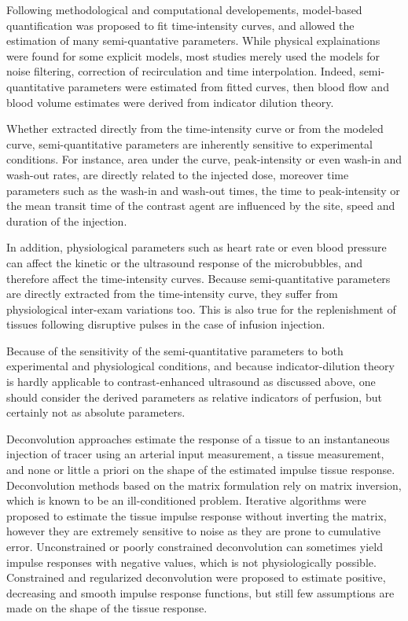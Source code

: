 Following methodological and computational developements, model-based quantification was proposed to fit time-intensity curves, and allowed the estimation of many semi-quantative parameters. 
While physical explainations were found for some explicit models, most studies merely used the models for noise filtering, correction of recirculation and time interpolation.
Indeed, semi-quantitative parameters were estimated from fitted curves, then blood flow and blood volume estimates were derived from indicator dilution theory.

Whether extracted directly from the time-intensity curve or from the modeled curve, semi-quantitative parameters are inherently sensitive to experimental conditions.
For instance, area under the curve, peak-intensity or even wash-in and wash-out rates, are directly related to the injected dose, moreover time parameters such as the wash-in and wash-out times, the time to peak-intensity or the mean transit time of the contrast agent are influenced by the site, speed and duration of the injection.

In addition, physiological parameters such as heart rate or even blood pressure can affect the kinetic or the ultrasound response of the microbubbles, and therefore affect the time-intensity curves. 
Because semi-quantitative parameters are directly extracted from the time-intensity curve, they suffer from physiological inter-exam variations too. 
This is also true for the replenishment of tissues following disruptive pulses in the case of infusion injection.

Because of the sensitivity of the semi-quantitative parameters to both experimental and physiological conditions, and because indicator-dilution theory is hardly applicable to contrast-enhanced ultrasound as discussed above, one should consider the derived parameters as relative indicators of perfusion, but certainly not as absolute parameters.

Deconvolution approaches estimate the response of a tissue to an instantaneous injection of tracer using an arterial input measurement, a tissue measurement, and none or little a priori on the shape of the estimated impulse tissue response.
Deconvolution methods based on the matrix formulation rely on matrix inversion, which is known to be an ill-conditioned problem.
Iterative algorithms were proposed to estimate the tissue impulse response without inverting the matrix, however they are extremely sensitive to noise as they are prone to cumulative error.
Unconstrained or poorly constrained deconvolution can sometimes yield impulse responses with negative values, which is not physiologically possible.
Constrained and regularized deconvolution were proposed to estimate positive, decreasing and smooth impulse response functions, but still few assumptions are made on the shape of the tissue response.

